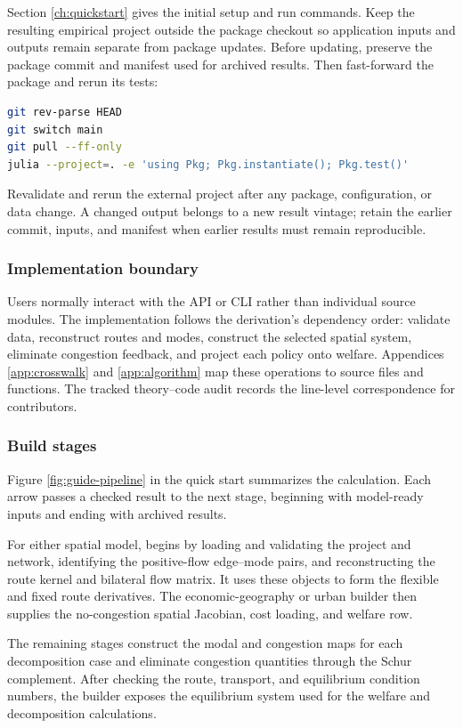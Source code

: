 Section \ref{ch:quickstart} gives the initial setup and run commands. Keep the
resulting empirical project outside the package checkout so application inputs
and outputs remain separate from package updates. Before updating, preserve
the package commit and manifest used for archived results. Then fast-forward
the package and rerun its tests:
\begin{lstlisting}[language=bash]
git rev-parse HEAD
git switch main
git pull --ff-only
julia --project=. -e 'using Pkg; Pkg.instantiate(); Pkg.test()'
\end{lstlisting}
Revalidate and rerun the external project after any package, configuration, or
data change. A changed output belongs to a new result vintage; retain the
earlier commit, inputs, and manifest when earlier results must remain
reproducible.

\subsubsection{Implementation boundary}

Users normally interact with the API or CLI rather than individual source
modules. The implementation follows the derivation's dependency order:
validate data, reconstruct routes and modes, construct the selected spatial
system, eliminate congestion feedback, and project each policy onto welfare.
Appendices \ref{app:crosswalk} and \ref{app:algorithm} map these operations to
source files and functions. The tracked theory--code audit records the
line-level correspondence for contributors.

\subsubsection{Build stages}

Figure \ref{fig:guide-pipeline} in the quick start summarizes the calculation.
Each arrow passes a checked result to the next stage, beginning with
model-ready inputs and ending with archived results.

For either spatial model,  begins by loading and validating
the project and network, identifying the positive-flow edge--mode pairs, and
reconstructing the route kernel and bilateral flow matrix. It uses these
objects to form the flexible and fixed route derivatives. The
economic-geography or urban builder then supplies the no-congestion spatial
Jacobian, cost loading, and welfare row.

The remaining stages construct the modal and congestion maps for each
decomposition case and eliminate congestion quantities through the Schur
complement. After checking the route, transport, and equilibrium condition
numbers, the builder exposes the equilibrium system used for the welfare and
decomposition calculations.

